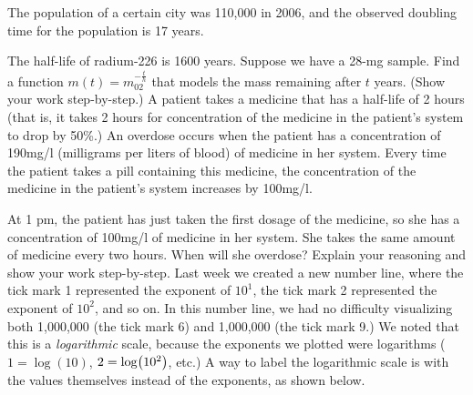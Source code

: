 \documentclass[12pt,answers]{exam}
\let\originalleft\left
\let\originalright\right
\renewcommand{\left}{\mathopen{}\mathclose\bgroup\originalleft}
\renewcommand{\right}{\aftergroup\egroup\originalright}
\begin{document}
\begin{questions}


\addpoints

\question The population of a certain city was 110,000 in 2006, and the observed doubling time for the population is 17 years.
\question[2] The half-life of radium-226 is 1600 years. Suppose we have a 28-mg sample.
Find a function 
$\displaystyle m(t) = m_02^{-\frac{t}{h}}$
 that models the mass remaining after $t$ years. (Show your work step-by-step.)
 \fillwithdottedlines{2.5cm}
 \question[2] A patient takes a medicine that has a half-life of 2 hours (that is, it takes 2 hours for concentration of the medicine in the patient's system to drop by 50\%.) An overdose occurs when the patient has a  concentration of 190mg/l (milligrams per liters of blood) of medicine in her system. Every time the patient takes a pill containing this medicine, the concentration of the medicine in the patient's system increases by 100mg/l.

At 1 pm, the patient has just taken the first dosage of the medicine, so she has a concentration of 100mg/l of medicine in her system. She takes the same amount of medicine every two hours. When will she overdose? Explain your reasoning and show your work step-by-step. 
\fillwithdottedlines{4cm}
\newpage
\thispagestyle{empty}
 \bonusquestion[2] Last week we created a new number line, where the tick mark 1 represented the exponent of $\displaystyle 10^1$, the tick mark 2 represented the exponent of $\displaystyle 10^2$, and so on. In this number line, we had no difficulty visualizing both 1,000,000 (the tick mark 6) and 1,000,000 (the tick mark 9.) We noted that this is a \emph{logarithmic} scale, because the exponents we plotted were logarithms ($\displaystyle 1=\log(10)$, $2=\log\left( 10^2\right)$, etc.) A way to label the logarithmic scale is with the values themselves instead of the exponents, as shown below. 
	

\end{questions}
\end{document}
